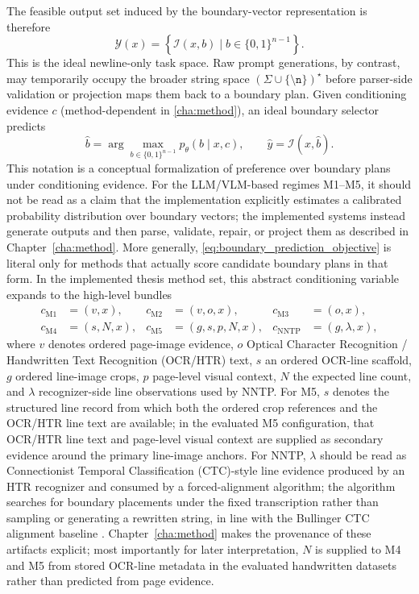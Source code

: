 The feasible output set induced by the boundary-vector representation is therefore
\begin{equation}
\mathcal{Y}(x)=\left\{\mathcal{I}(x,b)\mid b\in\{0,1\}^{n-1}\right\}.
\label{eq:feasible_set}
\end{equation}
This is the ideal newline-only task space. Raw prompt generations, by contrast, may temporarily occupy the broader string space $(\Sigma\cup\{\texttt{\textbackslash n}\})^\star$ before parser-side validation or projection maps them back to a boundary plan.
Given conditioning evidence $c$ (method-dependent in \autoref{cha:method}), an ideal boundary selector predicts
\begin{equation}
\hat{b}=\arg\max_{b\in\{0,1\}^{n-1}} p_\theta(b\mid x,c),\qquad
\hat{y}=\mathcal{I}(x,\hat{b}).
\label{eq:boundary_prediction_objective}
\end{equation}
This notation is a conceptual formalization of preference over boundary plans under conditioning evidence. For the LLM/VLM-based regimes M1--M5, it should not be read as a claim that the implementation explicitly estimates a calibrated probability distribution over boundary vectors; the implemented systems instead generate outputs and then parse, validate, repair, or project them as described in Chapter~\ref{cha:method}. More generally, \autoref{eq:boundary_prediction_objective} is literal only for methods that actually score candidate boundary plans in that form.
In the implemented thesis method set, this abstract conditioning variable expands to the high-level bundles
\[
\begin{aligned}
c_{\mathrm{M1}}&=(v,x), &
c_{\mathrm{M2}}&=(v,o,x), &
c_{\mathrm{M3}}&=(o,x), \\
c_{\mathrm{M4}}&=(s,N,x), &
c_{\mathrm{M5}}&=(g,s,p,N,x), &
c_{\mathrm{NNTP}}&=(g,\lambda,x),
\end{aligned}
\]
where $v$ denotes ordered page-image evidence, $o$ Optical Character Recognition / Handwritten Text Recognition (OCR/HTR) text, $s$ an ordered OCR-line scaffold, $g$ ordered line-image crops, $p$ page-level visual context, $N$ the expected line count, and $\lambda$ recognizer-side line observations used by NNTP. For M5, $s$ denotes the structured line record from which both the ordered crop references and the OCR/HTR line text are available; in the evaluated M5 configuration, that OCR/HTR line text and page-level visual context are supplied as secondary evidence around the primary line-image anchors. For NNTP, $\lambda$ should be read as Connectionist Temporal Classification (CTC)-style line evidence produced by an HTR recognizer and consumed by a forced-alignment algorithm; the algorithm searches for boundary placements under the fixed transcription rather than sampling or generating a rewritten string, in line with the Bullinger CTC alignment baseline . Chapter~\ref{cha:method} makes the provenance of these artifacts explicit; most importantly for later interpretation, $N$ is supplied to M4 and M5 from stored OCR-line metadata in the evaluated handwritten datasets rather than predicted from page evidence.

